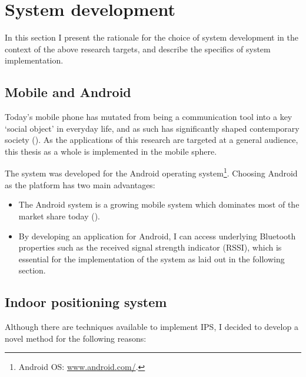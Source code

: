 \documentclass[a4paper,11pt]{article}
\begin{document}
\clearpage\section{System development}

In this section I present the rationale for the choice of system development in the context of the above research targets, and describe the specifics of system implementation.

\subsection{Mobile and Android}

Today's mobile phone has mutated from being a communication tool into a key `social object' in everyday life, and as such has significantly shaped contemporary society (\cite{srivastava05}).
As the applications of this research are targeted at a general audience, this thesis as a whole is implemented in the mobile sphere.

The system was developed for the Android operating system\footnote{Android OS: \href{http://www.android.com/}{www.android.com/}.}.
Choosing Android as the platform has two main advantages:
\begin{itemize}
	\item The Android system is a growing mobile system which dominates most of the market share today (\cite{web:idc}).
	\item By developing an application for Android, I can access underlying Bluetooth properties such as the received signal strength indicator (RSSI), which is essential for the implementation of the system as laid out in the following section.
\end{itemize}

\subsection{Indoor positioning system}\label{methods:ips}

Although there are techniques available to implement IPS, I decided to develop a novel method for the following reasons:
\end{document}
